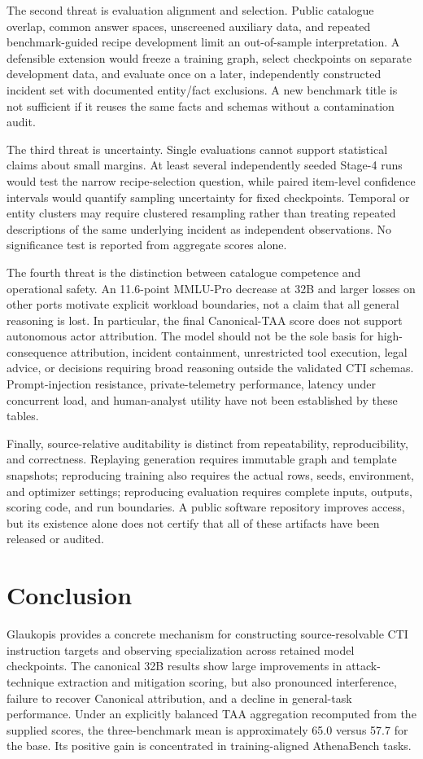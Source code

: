\documentclass[journal]{IEEEtran}
\begin{document}
The second threat is evaluation alignment and selection. Public catalogue overlap, common answer spaces, unscreened auxiliary data, and repeated benchmark-guided recipe development limit an out-of-sample interpretation. A defensible extension would freeze a training graph, select checkpoints on separate development data, and evaluate once on a later, independently constructed incident set with documented entity/fact exclusions. A new benchmark title is not sufficient if it reuses the same facts and schemas without a contamination audit.

The third threat is uncertainty. Single evaluations cannot support statistical claims about small margins. At least several independently seeded Stage-4 runs would test the narrow recipe-selection question, while paired item-level confidence intervals would quantify sampling uncertainty for fixed checkpoints. Temporal or entity clusters may require clustered resampling rather than treating repeated descriptions of the same underlying incident as independent observations. No significance test is reported from aggregate scores alone.

The fourth threat is the distinction between catalogue competence and operational safety. An 11.6-point MMLU-Pro decrease at 32B and larger losses on other ports motivate explicit workload boundaries, not a claim that all general reasoning is lost. In particular, the final Canonical-TAA score does not support autonomous actor attribution. The model should not be the sole basis for high-consequence attribution, incident containment, unrestricted tool execution, legal advice, or decisions requiring broad reasoning outside the validated CTI schemas. Prompt-injection resistance, private-telemetry performance, latency under concurrent load, and human-analyst utility have not been established by these tables.

Finally, source-relative auditability is distinct from repeatability, reproducibility, and correctness. Replaying generation requires immutable graph and template snapshots; reproducing training also requires the actual rows, seeds, environment, and optimizer settings; reproducing evaluation requires complete inputs, outputs, scoring code, and run boundaries. A public software repository improves access, but its existence alone does not certify that all of these artifacts have been released or audited.

\section{Conclusion}\label{sec:conclusion}
Glaukopis provides a concrete mechanism for constructing source-resolvable CTI instruction targets and observing specialization across retained model checkpoints. The canonical 32B results show large improvements in attack-technique extraction and mitigation scoring, but also pronounced interference, failure to recover Canonical attribution, and a decline in general-task performance. Under an explicitly balanced TAA aggregation recomputed from the supplied scores, the three-benchmark mean is approximately 65.0 versus 57.7 for the base. Its positive gain is concentrated in training-aligned AthenaBench tasks.
\end{document}
